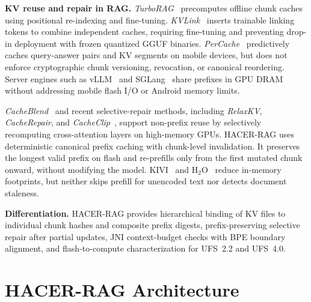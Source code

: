 \documentclass[10pt,conference]{IEEEtran}
\newcommand{\systemname}{HACER-RAG}
\begin{document}
\textbf{KV reuse and repair in RAG.} \emph{TurboRAG}~\cite{lu2024turborag} precomputes offline chunk caches using positional re-indexing and fine-tuning. \emph{KVLink}~\cite{yang2025kvlink} inserts trainable linking tokens to combine independent caches, requiring fine-tuning and preventing drop-in deployment with frozen quantized GGUF binaries. \emph{PerCache}~\cite{liu2026percache} predictively caches query-answer pairs and KV segments on mobile devices, but does not enforce cryptographic chunk versioning, revocation, or canonical reordering. Server engines such as vLLM~\cite{kwon2023vllm} and SGLang~\cite{zheng2024sglang} share prefixes in GPU DRAM without addressing mobile flash I/O or Android memory limits.

\emph{CacheBlend}~\cite{yao2024cacheblend} and recent selective-repair methods, including \emph{RelaxKV}, \emph{CacheRepair}, and \emph{CacheClip}~\cite{selective2026preprints}, support non-prefix reuse by selectively recomputing cross-attention layers on high-memory GPUs. \systemname{} uses deterministic canonical prefix caching with chunk-level invalidation. It preserves the longest valid prefix on flash and re-prefills only from the first mutated chunk onward, without modifying the model. KIVI~\cite{liu2024kivi} and H$_2$O~\cite{zhang2024h2o} reduce in-memory footprints, but neither skips prefill for unencoded text nor detects document staleness.

\textbf{Differentiation.} \systemname{} provides hierarchical binding of KV files to individual chunk hashes and composite prefix digests, prefix-preserving selective repair after partial updates, JNI context-budget checks with BPE boundary alignment, and flash-to-compute characterization for UFS~2.2 and UFS~4.0.

\section{HACER-RAG Architecture}
\label{sec:architecture}
\end{document}
